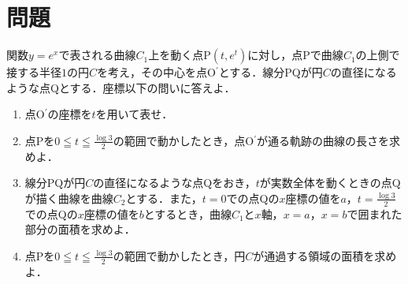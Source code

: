 \documentclass[a3paper,twocolumn,fleqn]{ltjsarticle}
\begin{document}
\section{問題}
関数$y=e^x$で表される曲線$C_1$上を動く点P$(t,e^t)$に対し，点Pで曲線$C_1$の上側で接する半径$1$の円$C$を考え，その中心を点O$^\prime$とする．線分PQが円$C$の直径になるような点Qとする．座標以下の問いに答えよ．
\begin{enumerate}[(1)]
    \item 点O$^\prime$の座標を$t$を用いて表せ．
    \item 点Pを$\displaystyle 0\leqq t\leqq \frac{\log3}{2} $の範囲で動かしたとき，点O$^\prime$が通る軌跡の曲線の長さを求めよ．
    \item 線分PQが円$C$の直径になるような点Qをおき，$t$が実数全体を動くときの点Qが描く曲線を曲線$C_2$とする．また，$t=0$での点Qの$x$座標の値を$a$，$\displaystyle t=\frac{\log3}{2}$での点Qの$x$座標の値を$b$とするとき，曲線$C_1$と$x$軸，$x=a$，$x=b$で囲まれた部分の面積を求めよ．
    \item 点Pを$\displaystyle 0\leqq t\leqq \frac{\log3}{2} $の範囲で動かしたとき，円$C$が通過する領域の面積を求めよ．
\end{enumerate}
\end{document}

